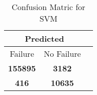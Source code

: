 \begin{table}[] 
\caption{Confusion Matric for SVM} 
\label{Table: Prediction Accuracy-NoneSVM90.0EKF-ignoreReflection-Reflection} 
\centering 
\begin{tabular} 
 {@{}ccc@{}} 
\toprule 
\multicolumn{2}{c}{\textbf{Predicted}}
 \\ \midrule 
\multicolumn{1}{|c|}{Failure} & 
\multicolumn{1}{c|}{No Failure}
 \\ \midrule 
\multicolumn{1}{|c|}{\color{green}\textbf{155895}} & 
\multicolumn{1}{c|}{\color{red}\textbf{3182}}
 \\ \midrule 
\multicolumn{1}{|c|}{\color{red}\textbf{416}} & 
\multicolumn{1}{c|}{\color{green}\textbf{10635}}
 \\ \bottomrule 
\end{tabular} 
\end{table} 
